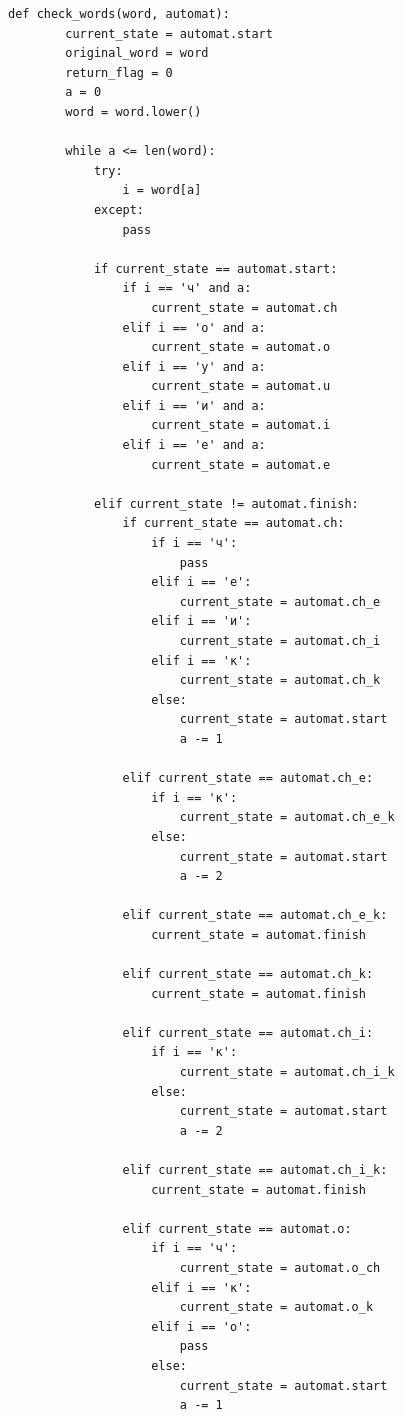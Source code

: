 \documentclass[a4paper,12pt]{report}
\begin{document}
	        \begin{lstlisting}[frame = single, breaklines, label = list:automat_func, caption = Листинг функций\, работающих с автоматом]
	def check_words(word, automat):
	    current_state = automat.start
	    original_word = word
	    return_flag = 0
	    a = 0
	    word = word.lower()
	
	    while a <= len(word):
	        try:
	            i = word[a]
	        except:
	            pass
	
	        if current_state == automat.start:
	            if i == 'ч' and a:
	                current_state = automat.ch
	            elif i == 'о' and a:
	                current_state = automat.o
	            elif i == 'у' and a:
	                current_state = automat.u
	            elif i == 'и' and a:
	                current_state = automat.i
	            elif i == 'е' and a:
	                current_state = automat.e
	
	        elif current_state != automat.finish:
	            if current_state == automat.ch:
	                if i == 'ч':
	                    pass
	                elif i == 'е':
	                    current_state = automat.ch_e
	                elif i == 'и':
	                    current_state = automat.ch_i
	                elif i == 'к':
	                    current_state = automat.ch_k
	                else:
	                    current_state = automat.start
	                    a -= 1
	
	            elif current_state == automat.ch_e:
	                if i == 'к':
	                    current_state = automat.ch_e_k
	                else:
	                    current_state = automat.start
	                    a -= 2
	
	            elif current_state == automat.ch_e_k:
	                current_state = automat.finish
	
	            elif current_state == automat.ch_k:
	                current_state = automat.finish
	
	            elif current_state == automat.ch_i:
	                if i == 'к':
	                    current_state = automat.ch_i_k
	                else:
	                    current_state = automat.start
	                    a -= 2
	
	            elif current_state == automat.ch_i_k:
	                current_state = automat.finish
	
	            elif current_state == automat.o:
	                if i == 'ч':
	                    current_state = automat.o_ch
	                elif i == 'к':
	                    current_state = automat.o_k
	                elif i == 'о':
	                    pass
	                else:
	                    current_state = automat.start
	                    a -= 1
	

\end{lstlisting}
\end{document}
